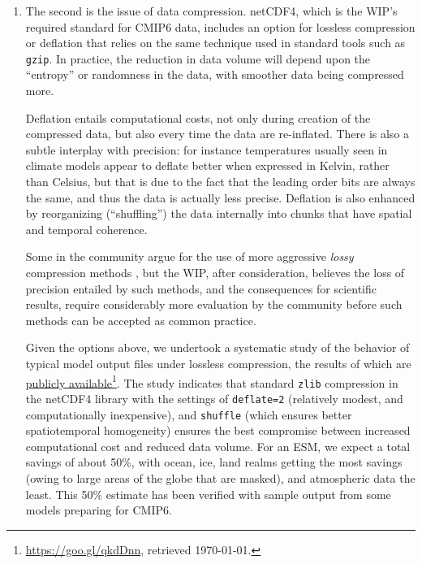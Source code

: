 \documentclass[gmd,manuscript]{copernicus}
\newcommand{\pllabel}[1]{\label{p-#1}\linelabel{l-#1}}
\newcommand{\urlref}[2] {\href{#1}{#2}\footnote{\url{#1}, retrieved \today.}}
\begin{document}
\begin{enumerate}
\item The second is the issue of data compression. netCDF4, which is
  the WIP's required standard for CMIP6 data, includes an option
  for lossless compression or deflation \citep{ref:zivlempel1977} that
  relies on the same technique used in standard tools such
  as \texttt{gzip}. In practice, the reduction in data volume will
  depend upon the ``entropy'' or randomness in the data, with
  smoother data being compressed more.

  Deflation entails computational costs, not only during creation of
  the compressed data, but also every time the data are re-inflated.
  There is also a subtle interplay with precision: for instance
  temperatures usually seen in climate models appear to deflate better
  when expressed in Kelvin, rather than Celsius, but that is due to
  the fact that the leading order bits are always the same, and thus
  the data is actually less precise. Deflation is also enhanced by
  reorganizing (``shuffling'') the data internally into chunks that
  have spatial and temporal coherence.

  Some in the community argue for the use of more aggressive
  \emph{lossy} compression methods \citep{ref:bakeretal2016}, but the
  WIP, after consideration, believes the loss of precision entailed by
  such methods, and the consequences for scientific results, require
  considerably more evaluation by the community before such methods
  can be accepted as common practice.

  Given the options above, we undertook a systematic study of the
  behavior of typical model output files under lossless compression,
  the results of which are \urlref{https://goo.gl/qkdDnn}{publicly
    available}. The study indicates that standard \texttt{zlib}
  compression in the netCDF4 library with the settings of
  \texttt{deflate=2} (relatively modest, and computationally
  inexpensive), and \texttt{shuffle} (which ensures better
  spatiotemporal homogeneity) ensures the best compromise between
  increased computational cost and reduced data volume. For an ESM,
  \pllabel{RC1-25}
  we expect a total savings of about 50\%, with ocean, ice, land
  realms getting the most savings (owing to large areas of the globe
  that are masked), and atmospheric data the least. This 50\% estimate
  has been verified with sample output from some models preparing for
  CMIP6.
\end{enumerate}
\end{document}
